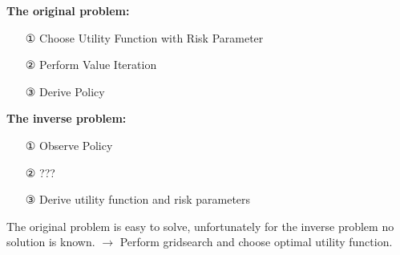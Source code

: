 \textbf{The original problem:}
\begin{itemize}
\item[①] Choose Utility Function with Risk Parameter
\item[②] Perform Value Iteration
\item[③] Derive Policy
\end{itemize}

\textbf{The inverse problem:}
\begin{itemize}
\item[①] Observe Policy
\item[②] ???
\item[③] Derive utility function and risk parameters
\end{itemize}
The original problem is easy to solve, unfortunately for the inverse problem no solution is known. $\rightarrow$ Perform gridsearch and choose optimal utility function.
